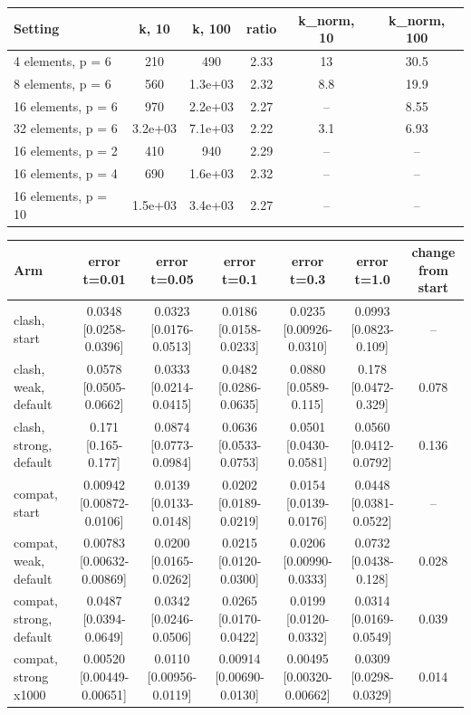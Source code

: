 \begin{tabular}{lccccc}
\toprule
Setting & k, 10 & k, 100 & ratio & k_norm, 10 & k_norm, 100 \\
\midrule
4 elements, p = 6 & 210 & 490 & 2.33 & 13 & 30.5 \\
8 elements, p = 6 & 560 & 1.3e+03 & 2.32 & 8.8 & 19.9 \\
16 elements, p = 6 & 970 & 2.2e+03 & 2.27 & -- & 8.55 \\
32 elements, p = 6 & 3.2e+03 & 7.1e+03 & 2.22 & 3.1 & 6.93 \\
16 elements, p = 2 & 410 & 940 & 2.29 & -- & -- \\
16 elements, p = 4 & 690 & 1.6e+03 & 2.32 & -- & -- \\
16 elements, p = 10 & 1.5e+03 & 3.4e+03 & 2.27 & -- & -- \\
\bottomrule
\end{tabular}

\begin{tabular}{lcccccc}
\toprule
Arm & error t=0.01 & error t=0.05 & error t=0.1 & error t=0.3 & error t=1.0 & change from start \\
\midrule
clash, start & 0.0348 {\scriptsize[0.0258-0.0396]} & 0.0323 {\scriptsize[0.0176-0.0513]} & 0.0186 {\scriptsize[0.0158-0.0233]} & 0.0235 {\scriptsize[0.00926-0.0310]} & 0.0993 {\scriptsize[0.0823-0.109]} & -- \\
clash, weak, default & 0.0578 {\scriptsize[0.0505-0.0662]} & 0.0333 {\scriptsize[0.0214-0.0415]} & 0.0482 {\scriptsize[0.0286-0.0635]} & 0.0880 {\scriptsize[0.0589-0.115]} & 0.178 {\scriptsize[0.0472-0.329]} & 0.078 \\
clash, strong, default & 0.171 {\scriptsize[0.165-0.177]} & 0.0874 {\scriptsize[0.0773-0.0984]} & 0.0636 {\scriptsize[0.0533-0.0753]} & 0.0501 {\scriptsize[0.0430-0.0581]} & 0.0560 {\scriptsize[0.0412-0.0792]} & 0.136 \\
compat, start & 0.00942 {\scriptsize[0.00872-0.0106]} & 0.0139 {\scriptsize[0.0133-0.0148]} & 0.0202 {\scriptsize[0.0189-0.0219]} & 0.0154 {\scriptsize[0.0139-0.0176]} & 0.0448 {\scriptsize[0.0381-0.0522]} & -- \\
compat, weak, default & 0.00783 {\scriptsize[0.00632-0.00869]} & 0.0200 {\scriptsize[0.0165-0.0262]} & 0.0215 {\scriptsize[0.0120-0.0300]} & 0.0206 {\scriptsize[0.00990-0.0333]} & 0.0732 {\scriptsize[0.0438-0.128]} & 0.028 \\
compat, strong, default & 0.0487 {\scriptsize[0.0394-0.0649]} & 0.0342 {\scriptsize[0.0246-0.0506]} & 0.0265 {\scriptsize[0.0170-0.0422]} & 0.0199 {\scriptsize[0.0120-0.0332]} & 0.0314 {\scriptsize[0.0169-0.0549]} & 0.039 \\
compat, strong x1000 & 0.00520 {\scriptsize[0.00449-0.00651]} & 0.0110 {\scriptsize[0.00956-0.0119]} & 0.00914 {\scriptsize[0.00690-0.0130]} & 0.00495 {\scriptsize[0.00320-0.00662]} & 0.0309 {\scriptsize[0.0298-0.0329]} & 0.014 \\
\bottomrule
\end{tabular}

